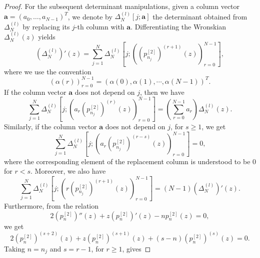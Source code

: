 \documentclass[10pt,a4paper]{amsart}
\begin{document}
\begin{proof}
For the subsequent determinant manipulations, given a column vector \(\mathbf{a}=(a_0,\ldots,a_{N-1})^T\), we denote by
\(\Delta_N^{(l)}[j;\mathbf{a}]\) the determinant obtained from \(\Delta_N^{(l)}\) by replacing its \(j\)-th column with \(\mathbf{a}\). Differentiating the Wronskian \(\Delta_N^{(l)}(z)\) yields 
\begin{equation}
\label{eq:k4-column-derivative-rule}
    \left(\Delta_N^{(l)}\right)'(z)=\sum_{j=1}^{N}
    \Delta_N^{(l)}\!\left[j;\left(\left(p_{n_j}^{[2]}\right)^{(r+1)}(z)\right)_{r=0}^{N-1}\right],
\end{equation}
where we use the convention
\begin{equation}
    \left(\alpha\left(r\right)\right)_{r=0}^{N-1}= \left(\alpha(0),\alpha(1),\cdots,\alpha(N-1)\right)^T.
\end{equation}
If the column vector \(\mathbf{a}\) does not depend on \(j\), then we have
\begin{equation}
\label{eq:k4-diagonal-row-rule}
    \sum_{j=1}^{N}
    \Delta_N^{(l)}\!\left[j;\left(a_r\left(p_{n_j}^{[2]}\right)^{(r)}(z)\right)_{r=0}^{N-1}\right]
    =
    \left(\sum_{r=0}^{N-1}a_r\right)\Delta_N^{(l)}(z).
\end{equation}
Similarly, if the column vector \(\mathbf{a}\) does not depend on \(j\), for \(s\geq1\), we get
\begin{equation}
\label{eq:k4-lower-row-rule}
    \sum_{j=1}^{N}
    \Delta_N^{(l)}\!\left[j;\left(a_r\left(p_{n_j}^{[2]}\right)^{(r-s)}(z)\right)_{r=0}^{N-1}\right]
    =
    0,
\end{equation}
where the corresponding element of the
replacement column is understood to be $0$ for $r<s$. Moreover, we also have
\begin{equation}
\label{eq:k4-r-upper-row-rule}
    \sum_{j=1}^{N}
    \Delta_N^{(l)}\!\left[j;\left(r\left(p_{n_j}^{[2]}\right)^{(r+1)}(z)\right)_{r=0}^{N-1}\right]
    =
    (N-1)\left(\Delta_N^{(l)}\right)'(z).
\end{equation}
Furthermore, from the relation
\begin{equation}
    2\left(p_n^{[2]}\right)''(z)+z\left(p_n^{[2]}\right)'(z)-np_n^{[2]}(z)=0,
\end{equation}
we get
\begin{equation}
\label{eq:k4-differentiated-Hermite-corrected}
    2\left(p_n^{[2]}\right)^{(s+2)}(z)
    +z\left(p_n^{[2]}\right)^{(s+1)}(z)
    +(s-n)\left(p_n^{[2]}\right)^{(s)}(z)
    =
    0.
\end{equation}
Taking \(n=n_j\) and \(s=r-1\), for \(r\geq1\), gives

\end{proof}
\end{document}
